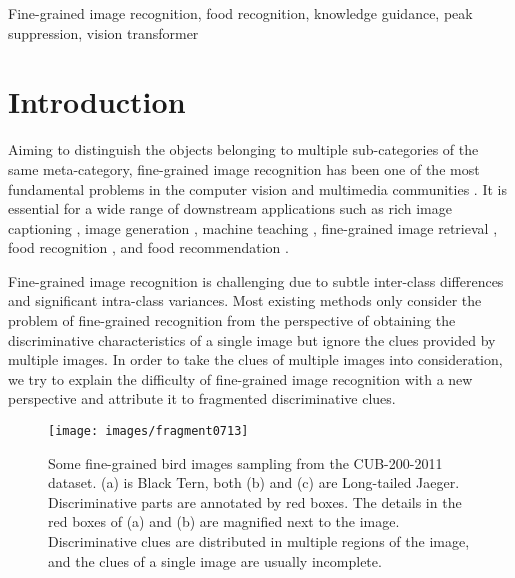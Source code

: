 \documentclass[5p,twocolumn]{elsarticle}
\begin{document}
\begin{frontmatter}
\begin{keyword}
Fine-grained image recognition, food recognition, knowledge guidance, peak suppression, vision transformer
\end{keyword}

\end{frontmatter}



\section{Introduction}






Aiming to distinguish the objects belonging to multiple sub-categories of the same meta-category, fine-grained image recognition has been one of the most fundamental problems in the computer vision and multimedia communities \cite{Han2018Attribute, He2018Only, Li2018I, Zhao2017Diversified, ARAUJO2022427}.
It is essential for a wide range of downstream applications such as rich image captioning \cite{Hendricks2016Deep}, image generation \cite{Bao2017CVAE}, machine teaching \cite{Aodha2018Teaching}, fine-grained image retrieval \cite{Pang2020Solving}, food recognition \cite{Min2019Ingredient, Min2017Being}, and food recommendation \cite{Min2020Food}.

Fine-grained image recognition is challenging due to subtle inter-class differences and significant intra-class variances. Most existing methods only consider the problem of fine-grained recognition from the perspective of obtaining the discriminative characteristics of a single image but ignore the clues provided by multiple images. In order to take the clues of multiple images into consideration, we try to explain the difficulty of fine-grained image recognition with a new perspective and attribute it to fragmented discriminative clues.

\begin{figure}
\centering
 \texttt{[image: images/fragment0713]}
  \caption{Some fine-grained bird images sampling from the CUB-200-2011 dataset. (a) is Black Tern, both (b) and (c) are Long-tailed Jaeger. Discriminative parts are annotated by red boxes. The details in the red boxes of (a) and (b) are magnified next to the image. Discriminative clues are distributed in multiple regions of the image, and the clues of a single image are usually incomplete.
}
  \label{fig:fragment}
\end{figure}
\end{document}
